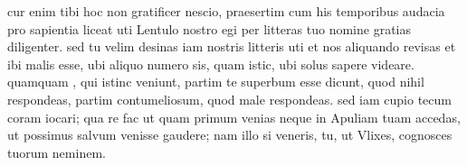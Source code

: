 


 cur enim tibi hoc non gratificer nescio, praesertim cum his temporibus audacia pro sapientia liceat uti Lentulo nostro egi per litteras tuo nomine gratias diligenter. sed tu velim desinas iam nostris litteris uti et nos aliquando revisas et ibi malis esse, ubi aliquo numero sis, quam istic, ubi solus sapere videare. quamquam , qui istinc veniunt, partim te superbum esse dicunt, quod nihil respondeas, partim contumeliosum, quod male respondeas. sed iam cupio tecum coram iocari; qua re fac ut quam primum venias neque in Apuliam tuam accedas, ut possimus salvum venisse gaudere; nam illo si veneris, tu, ut Vlixes, cognosces tuorum neminem.
